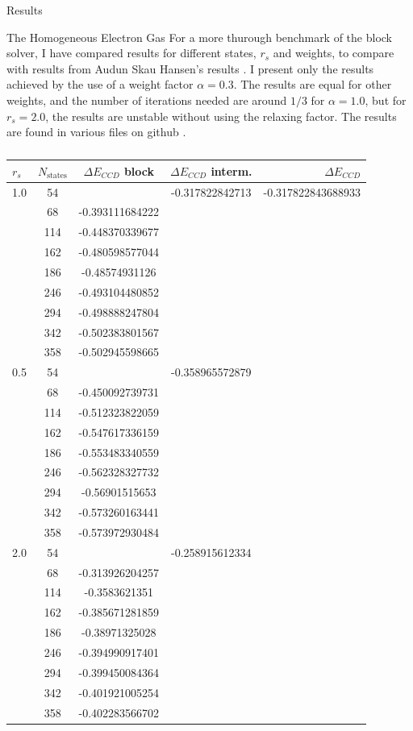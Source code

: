 \documentclass[twoside,english]{uiofysmaster}
\begin{document}
\begin{chapter}{Results}
\begin{section}{The Homogeneous Electron Gas}
		For a more thurough benchmark of the block solver, I have compared results for different states, $r_s$ and weights, to compare with results from Audun Skau Hansen's results \cite{Audun}. I present only the results achieved by the use of a weight factor $\alpha = 0.3$. The results are equal for other weights, and the number of iterations needed are around $1/3$ for $\alpha = 1.0$, but for $r_s = 2.0$, the results are unstable without using the relaxing factor. The results are found in various files on github \cite{WholmenGithub}.
		\begin{table}[H]
			\begin{center}
				\begin{tabular}[center]{l  c | c  c r}
					$r_s$ & $N_{\text{states}}$ & $\Delta E_{CCD}$ block & $\Delta E_{CCD}$ interm. & $\Delta E_{CCD}$ \cite{Audun} \\
					\hline
					1.0 &  54 &  & -0.317822842713 & -0.317822843688933 \\
						&  68 & -0.393111684222 &   \\
						& 114 & -0.448370339677 &   \\
						& 162 & -0.480598577044 &   \\
						& 186 & -0.48574931126 &   \\
						& 246 & -0.493104480852 &   \\
						& 294 & -0.498888247804 &   \\
						& 342 & -0.502383801567  &   \\
						& 358 & -0.502945598665 &   \\
					\hline
					0.5 &  54 &  & -0.358965572879    \\
						&  68 & -0.450092739731 &   \\
						& 114 & -0.512323822059 &   \\
						& 162 & -0.547617336159 &   \\
						& 186 & -0.553483340559 &   \\
						& 246 & -0.562328327732 &   \\
						& 294 & -0.56901515653 &   \\
						& 342 & -0.573260163441 &   \\
						& 358 & -0.573972930484 &   \\
					\hline
					2.0 &  54 &  & -0.258915612334    \\
						&  68 & -0.313926204257 &   \\
						& 114 & -0.3583621351 \\
						& 162 & -0.385671281859 \\
						& 186 & -0.38971325028 &   \\
						& 246 & -0.394990917401 &   \\
						& 294 & -0.399450084364 &   \\
						& 342 & -0.401921005254 &   \\
						& 358 & -0.402283566702 &   \\
				\end{tabular}
			\end{center}
			\caption{ }
			\label{table:CompareAudun}
		\end{table}


\end{section}
\end{chapter}
\end{document}
